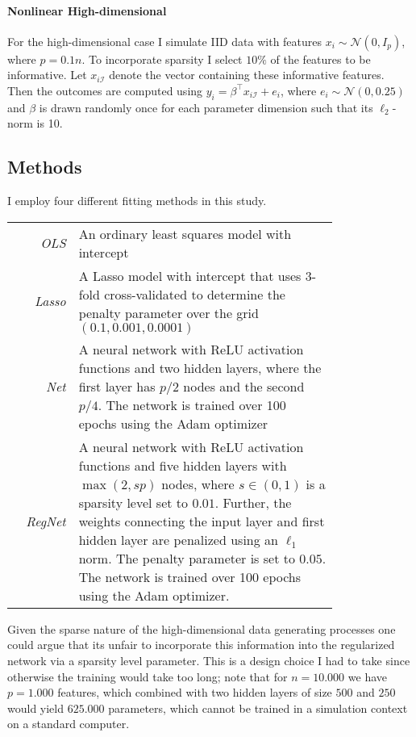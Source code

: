 \paragraph{Nonlinear High-dimensional}

For the high-dimensional case I simulate IID data with features $x_i \sim \mathcal{N}(0,
I_p)$, where $p = 0.1 n$. To incorporate sparsity I select $10\%$ of the features to be
informative. Let $x_{i\mathcal{I}}$ denote the vector containing these informative
features. Then the outcomes are computed using $y_i = \beta^\top x_{i\mathcal{I}} +
e_i$, where $e_i \sim \mathcal{N}(0, 0.25)$ and $\beta$ is drawn randomly once for each
parameter dimension such that its $\ell_2$-norm is 10.


\subsection{Methods}

I employ four different fitting methods in this study.

\begin{center}
\begin{tabular}{r | p{0.8\linewidth}}
    \textit{OLS} & An ordinary least squares model with intercept \\
    \textit{Lasso} & A Lasso model with intercept that uses $3$-fold cross-validated to
        determine the penalty parameter over the grid $(0.1, 0.001, 0.0001)$  \\
    \textit{Net} & A neural network with ReLU activation functions and two hidden layers, where
        the first layer has $p/2$ nodes and the second $p/4$. The network is trained over
        100 epochs using the Adam optimizer  \\
    \textit{RegNet} & A neural network with ReLU activation functions and five hidden
        layers with $\max(2, s p)$ nodes, where $s \in (0, 1)$ is a sparsity level set
        to $0.01$. Further, the weights connecting the input layer and first hidden
        layer are penalized using an $\ell_1$ norm. The penalty parameter is set to
        $0.05$. The network is trained over 100 epochs using the Adam optimizer.
\end{tabular}
\end{center}

\begin{remark}
Given the sparse nature of the high-dimensional data generating processes one could
argue that its unfair to incorporate this information into the regularized network via
a sparsity level parameter. This is a design choice I had to take since otherwise the
training would take too long; note that for $n = 10.000$ we have $p = 1.000$ features,
which combined with two hidden layers of size $500$ and $250$ would yield $625.000$
parameters, which cannot be trained in a simulation context on a standard computer.
\end{remark}

